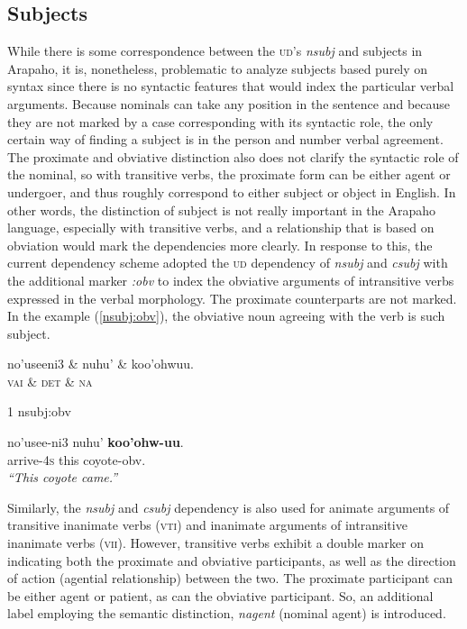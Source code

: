 \documentclass[11pt]{article}
\begin{document}
\subsection{Subjects}
While there is some correspondence between the \textsc{ud}'s \textit{nsubj} and subjects in Arapaho, it is, nonetheless, problematic to analyze subjects based purely on syntax since there is no syntactic features that would index the particular verbal arguments. Because nominals can take any position in the sentence and because they are not marked by a case corresponding with its syntactic role, the only certain way of finding a subject is in the person and number verbal agreement. The proximate and obviative distinction also does not clarify the syntactic role of the nominal, so with transitive verbs, the proximate form can be either agent or undergoer, and thus roughly correspond to either subject or object in English. In other words, the distinction of subject is not really important in the Arapaho language, especially with transitive verbs, and a relationship that is based on obviation would mark the dependencies more clearly. In response to this, the current dependency scheme adopted the \textsc{ud} dependency of \textit{nsubj} and \textit{csubj} with the additional marker \textit{:obv} to index the obviative arguments of intransitive verbs expressed in the verbal morphology. The proximate counterparts are not marked. In the example (\ref{nsubj:obv}), the obviative noun agreeing with the verb is such subject.

\small
\begin{exe}
\ex \label{nsubj:obv} %
\begin{adjustwidth*}{-0.1in}{-0.1in}
\begin{dependency}
\begin{deptext}
no'useeni3 \& nuhu' \& koo'ohwuu.\\
\textsc{vai} \& \textsc{det} \& \textsc{na}\\
\end{deptext}
	{1}	{nsubj:obv}
\end{dependency}
\gll no'usee-ni3 nuhu' \textbf{koo'ohw-uu}.\\
{arrive-\textsc{4s}} this coyote-obv.\\
\trans \textit{``This coyote came.''}
\end{adjustwidth*}
\end{exe}
\normalsize
Similarly, the \textit{nsubj} and \textit{csubj} dependency is also used for animate arguments of transitive inanimate verbs (\textsc{vti}) and inanimate arguments of intransitive inanimate verbs (\textsc{vii}). However, transitive verbs exhibit a double marker on indicating both the proximate and obviative participants, as well as the direction of action (agential relationship) between the two. The proximate participant can be either agent or patient, as can the obviative participant. So, an additional label employing the semantic distinction, \textit{nagent} (nominal agent) is introduced.
\end{document}
